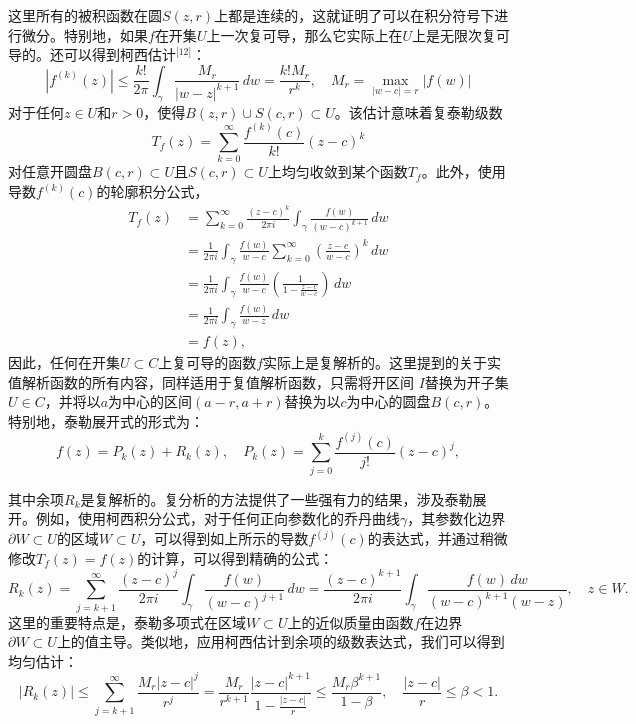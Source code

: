 这里所有的被积函数在圆\( S(z, r) \)上都是连续的，这就证明了可以在积分符号下进行微分。特别地，如果\( f \)在开集\( U \)上一次复可导，那么它实际上在\( U \)上是无限次复可导的。还可以得到柯西估计\(^\text{[12]}\)：
\[
|f^{(k)}(z)| \leq \frac{k!}{2\pi} \int_{\gamma} \frac{M_r}{|w - z|^{k+1}} \, dw = \frac{k! M_r}{r^k}, \quad M_r = \max_{|w - c| = r} |f(w)|~
\]
对于任何\( z \in U \)和\( r > 0 \)，使得\( B(z, r) \cup S(c, r) \subset U \)。该估计意味着复泰勒级数
\[
T_f(z) = \sum_{k=0}^{\infty} \frac{f^{(k)}(c)}{k!} (z - c)^k~
\]
对任意开圆盘\( B(c, r) \subset U \)且\( S(c, r) \subset U \)上均匀收敛到某个函数\( T_f \)。此外，使用导数\( f^{(k)}(c) \)的轮廓积分公式，
\[
\begin{aligned}
T_f(z) &= \sum_{k=0}^{\infty} \frac{(z - c)^k}{2\pi i} \int_{\gamma} \frac{f(w)}{(w - c)^{k+1}} \, dw \\
&= \frac{1}{2\pi i} \int_{\gamma} \frac{f(w)}{w - c} \sum_{k=0}^{\infty} \left( \frac{z - c}{w - c} \right)^k \, dw \\
&= \frac{1}{2\pi i} \int_{\gamma} \frac{f(w)}{w - c} \left( \frac{1}{1 - \frac{z - c}{w - c}} \right) \, dw \\
&= \frac{1}{2\pi i} \int_{\gamma} \frac{f(w)}{w - z} \, dw \\
&= f(z),
\end{aligned}~
\]
因此，任何在开集\( U \subset C \)上复可导的函数\( f \)实际上是复解析的。这里提到的关于实值解析函数的所有内容，同样适用于复值解析函数，只需将开区间 \( I \)替换为开子集 \( U \in C \)，并将以\( a \)为中心的区间\( (a - r, a + r) \)替换为以\( c \)为中心的圆盘\( B(c, r) \)。特别地，泰勒展开式的形式为：
\[
f(z) = P_k(z) + R_k(z), \quad P_k(z) = \sum_{j=0}^{k} \frac{f^{(j)}(c)}{j!} (z - c)^j,~
\]

其中余项\( R_k \)是复解析的。复分析的方法提供了一些强有力的结果，涉及泰勒展开。例如，使用柯西积分公式，对于任何正向参数化的乔丹曲线\( \gamma \)，其参数化边界\( \partial W \subset U \)的区域\( W \subset U \)，可以得到如上所示的导数\( f^{(j)}(c) \)的表达式，并通过稍微修改\( T_f(z) = f(z) \)的计算，可以得到精确的公式：
\[
R_k(z) = \sum_{j=k+1}^{\infty} \frac{(z - c)^j}{2\pi i} \int_{\gamma} \frac{f(w)}{(w - c)^{j+1}} \, dw = \frac{(z - c)^{k+1}}{2\pi i} \int_{\gamma} \frac{f(w) \, dw}{(w - c)^{k+1} (w - z)}, \quad z \in W.~
\]
这里的重要特点是，泰勒多项式在区域\( W \subset U \)上的近似质量由函数\( f \)在边界 \( \partial W \subset U \)上的值主导。类似地，应用柯西估计到余项的级数表达式，我们可以得到均匀估计：
\[
|R_k(z)| \leq \sum_{j=k+1}^{\infty} \frac{M_r |z - c|^j}{r^j} = \frac{M_r}{r^{k+1}} \frac{|z - c|^{k+1}}{1 - \frac{|z - c|}{r}} \leq \frac{M_r \beta^{k+1}}{1 - \beta}, \quad \frac{|z - c|}{r} \leq \beta < 1.~
\]
